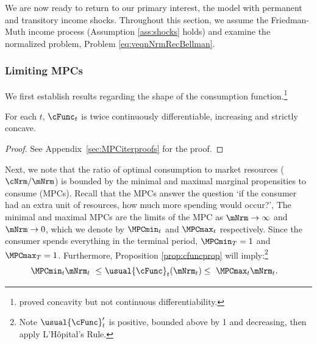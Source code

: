 \documentclass[\econtexRoot/BufferStockTheory]{subfiles}
\begin{document}
We are now ready to return to our primary interest, the model with permanent and transitory income shocks.
Throughout this section, we assume the Friedman-Muth income process (Assumption \ref{ass:shocks} holds) and examine the normalized problem, Problem \ref{eq:veqnNrmRecBellman}.



\subsubsection{Limiting MPCs}\label{subsubsec:cFuncBounds}\label{subsec:LimitsAsmtToInfty}\label{subsec:LimitsAsmtToZero}%

We first establish results regarding the shape of the consumption function.\footnote{\cite{ckConcavity} proved concavity but not continuous differentiability.}

\begin{proposition} \label{prop:cfuncprop} For each $t$, $\cFunc_{t}$ is twice continuously differentiable, increasing and strictly concave.
\end{proposition}
\begin{proof}\let\qed\relax
See Appendix~\ref{sec:MPCiterproofs} for the proof.

\end{proof}

Next, we note that the ratio of optimal consumption to market resources ($\cNrm/\mNrm$) is bounded by the minimal and maximal marginal propensities to consume (MPCs).
Recall that the MPCs answer the question `if the consumer had an extra unit of resources, how much more spending would occur?', The minimal and maximal MPCs are the limits of the MPC as $\mNrm \rightarrow \infty$ and $\mNrm \rightarrow 0$, which we denote by $\MPCmin_{t}$ and $\MPCmax_{t}$ respectively.
Since the consumer spends everything in the terminal period, $\MPCmin_{T}=1$ and $\MPCmax_{T}=1$.
Furthermore, Proposition \ref{prop:cfuncprop} will imply:\footnote{Note $\usual{\cFunc}_{t}^{\prime}$ is positive, bounded above by 1 and decreasing, then apply L'H\^{o}pital's Rule.}
%
\begin{equation}\begin{gathered}\begin{aligned}\label{eq:cBounds}
  \MPCmin_{t} \mNrm_{t} ~ \leq & ~  \usual{\cFunc}_{t}(\mNrm_{t})  \leq  ~ \MPCmax_{t} \mNrm_{t} .
\end{aligned}\end{gathered}\end{equation} 
\end{document}
